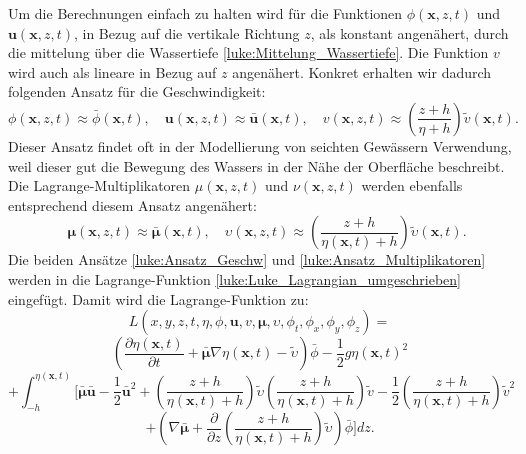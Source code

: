 Um die Berechnungen einfach zu halten wird für die Funktionen $\phi (\bm{x},z,t)$ und $\bm{u} (\bm{x},z,t)$, in Bezug auf die vertikale Richtung $z$, als konstant angenähert, durch die mittelung über die Wassertiefe \eqref{luke:Mittelung_Wassertiefe}.
Die Funktion $v$ wird auch als lineare in Bezug auf $z$ angenähert. 
Konkret erhalten wir dadurch folgenden Ansatz für die Geschwindigkeit:
\begin{equation}
	\phi(\bm{x},z,t) \approx \bar{\phi}(\bm{x}, t), \quad \bm{u}(\bm{x},z,t) \approx \bar{\bm{u}}(\bm{x}, t), \quad v(\bm{x},z,t) \approx \left(\frac{z + h}{\eta + h}\right) \tilde{v}(\bm{x}, t).
	\label{luke:Ansatz_Geschw}
\end{equation}
Dieser Ansatz findet oft in der Modellierung von seichten Gewässern Verwendung, weil dieser gut die Bewegung des Wassers in der Nähe der Oberfläche beschreibt.
Die Lagrange-Multiplikatoren $\mu(\bm{x},z,t)$ und $\nu(\bm{x},z,t)$ werden ebenfalls entsprechend diesem Ansatz angenähert:
\begin{equation}
	\quad \bm{\mu}(\bm{x},z,t) \approx \bar{\bm{\mu}}(\bm{x}, t), \quad \upsilon(\bm{x},z,t) \approx \left(\frac{z + h}{\eta(\bm{x}, t) + h}\right)\tilde{\upsilon}(\bm{x}, t).
	\label{luke:Ansatz_Multiplikatoren}
\end{equation}
Die beiden Ansätze \eqref{luke:Ansatz_Geschw} und \eqref{luke:Ansatz_Multiplikatoren} werden in die Lagrange-Funktion \eqref{luke:Luke_Lagrangian_umgeschrieben} eingefügt.
Damit wird die Lagrange-Funktion zu:
\[
L(x,y,z,t,\eta,\phi,\bm{u}, v, \bm{\mu},\upsilon,\phi_t,\phi_x,\phi_y,\phi_z)
=
\]
\[
\left(\frac{\partial \eta(\bm{x}, t)}{\partial t}
+
\bar{\bm{\mu}}  \nabla \eta(\bm{x}, t)
-
\widetilde{\upsilon}\right) \bar{\phi}
-
\frac{1}{2} g \eta(\bm{x}, t)^2
\]
\[
+
\int_{-h}^{\eta(\bm{x}, t)} \Bigg[ \bar{\bm{\mu}}  \bar{\bm{u}} - \frac{1}{2} \bar{\bm{u}}^2 +\left(\frac{z + h}{\eta(\bm{x}, t) + h}\right)\tilde{\upsilon} \left(\frac{z + h}{\eta(\bm{x}, t) + h}\right)\tilde{v} - \frac{1}{2} \left(\frac{z + h}{\eta(\bm{x}, t) + h}\right)\tilde{v}^2 
\]
\[
+\left(\nabla \bar{\bm{\mu}} + \frac{\partial}{\partial z} \left(\frac{z + h}{\eta(\bm{x}, t) + h}\right)\tilde{\upsilon}\right) \bar{\phi} \Bigg] dz.
\]

